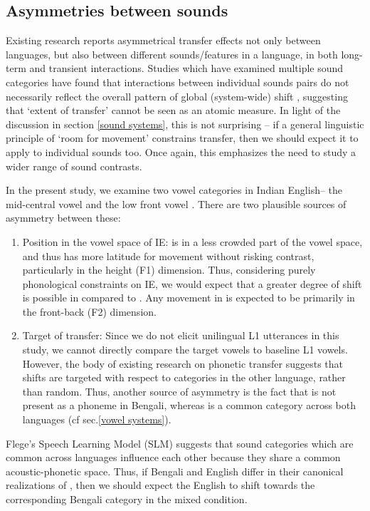 \documentclass[charis,linguex]{glossa}
\newcommand{\nt}[1]{\textipa{[#1]}} %
\begin{document}
\subsection{Asymmetries between sounds}\label{asymmetry between sounds}

Existing research reports asymmetrical transfer effects not only between languages, but also between different sounds/features in a language, in both long-term and transient interactions. Studies which have examined multiple sound categories have found that interactions between individual sounds pairs do not necessarily reflect the overall pattern of global (system-wide) shift \citep{chang2012rapid,elias2017effects}, suggesting that `extent of transfer' cannot be seen as an atomic measure. In light of the discussion in section \ref{sound systems}, this is not surprising -- if a general linguistic principle of `room for movement' constrains transfer, then we should expect it to apply to individual sounds too. Once again, this emphasizes the need to study a wider range of sound contrasts.


In the present study, we examine two vowel categories in Indian English-- the mid-central vowel \nt{2} and the low front vowel \nt{\ae}. There are two plausible sources of asymmetry between these:
\begin{enumerate}
	\item Position in the vowel space of IE: \nt{2} is in a less crowded part of the vowel space, and thus has more latitude for movement without risking contrast, particularly in the height (F1) dimension. Thus, considering purely phonological constraints on IE, we would expect that a greater degree of shift is possible in \nt{2} compared to \nt{\ae}. Any movement in \nt{\ae} is expected to be primarily in the front-back (F2) dimension.
	\item Target of transfer: Since we do not elicit unilingual L1 utterances in this study, we cannot directly compare the target vowels to baseline L1 vowels. However, the body of existing research on phonetic transfer suggests that shifts are targeted with respect to categories in the other language, rather than random. Thus, another source of asymmetry is the fact that \nt{2} is not present as a phoneme in Bengali, whereas \nt{\ae} is a common category across both languages (cf sec.\ref{vowel systems}).
\end{enumerate}


Flege's Speech Learning Model (SLM) \citep{flege1995second,flege2007language} suggests that sound categories which are common across languages influence each other because they share a common acoustic-phonetic space. Thus, if Bengali and English differ in their canonical realizations of \nt{\ae}, then we should expect the English \nt{\ae} to shift towards the corresponding Bengali category in the mixed condition. 
\end{document}
